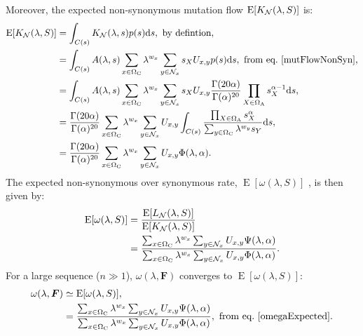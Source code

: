 Moreover, the expected non-synonymous mutation flow $\operatorname{E} [K_{\mathcal{N}}(\lambda, S)]$ is:
\begin{align}
\operatorname{E} [K_{\NonSyn}(\lambda, S)]
& =  \int_{C(s)} K_{\NonSyn}(\lambda, s) p(s) \der s, \ \textrm{by defintion}, \\
& =\int_{C(s)} A(\lambda, s) \sum_{x \in \SetCodon} \lambda^{w_x} \sum_{y \in \NxNonSyn} s_X U_{x, y} p(s) \der s , \ \textrm{from eq.}\ \ref{mutFlowNonSyn}, \\
& =\int_{C(s)} A(\lambda, s) \sum_{x \in \SetCodon} \lambda^{w_x} \sum_{y \in \NxNonSyn} s_X U_{x, y}{\frac {\Gamma (20 \alpha)}{\Gamma (\alpha )^{20}}} \prod_{X \in \SetAa} s_X^{\alpha-1} \der s,\\
& =\frac{\Gamma (20 \alpha)}{\Gamma (\alpha )^{20}} \sum_{x \in \SetCodon} \lambda^{w_x} \sum_{y \in \NxNonSyn} U_{x, y} \int_{C(s)} \dfrac{\prod_{X \in \SetAa} s_X^{\alpha}}{\sum_{y \in \SetCodon} \lambda^{w_y} s_Y}\der s,\\
& =\frac{\Gamma (20 \alpha)}{\Gamma (\alpha )^{20}} \sum_{x \in \SetCodon} \lambda^{w_x} \sum_{y \in \NxNonSyn} U_{x, y} \Phi(\lambda, \alpha).\\
\end{align}
The expected non-synonymous over synonymous rate, $\operatorname{E} [\omega(\lambda, S)]$ , is then given by:
\begin{align}
\operatorname{E} [\omega(\lambda, S)]
& =  \dfrac{\operatorname{E} [L_{\mathcal{N}}(\lambda, S)]}{\operatorname{E} [K_{\mathcal{N}}(\lambda, S)]} \\
& =\dfrac{\sum_{x \in \Omega_{\mathrm{C}}} \lambda^{w_x} \sum_{y \in \mathcal{N}_x} U_{x, y} \Psi(\lambda, \alpha)}{\sum_{x \in \Omega_{\mathrm{C}}} \lambda^{w_x} \sum_{y \in \mathcal{N}_x} U_{x, y} \Phi(\lambda, \alpha)}.
\label{omegaExpected}
\end{align}
For a large sequence ($ n \gg 1 $), $\omega (\lambda, \bm{F})$ converges to $\operatorname{E} [\omega(\lambda, S)]$:
\begin{align}
\omega (\lambda, \bm{F})
& \simeq \operatorname{E} [\omega(\lambda, S)],\\
& =\dfrac{\sum_{x \in \SetCodon} \lambda^{w_x} \sum_{y \in \NxNonSyn} U_{x, y} \Psi(\lambda, \alpha)}{\sum_{x \in \SetCodon} \lambda^{w_x} \sum_{y \in \NxNonSyn} U_{x, y} \Phi(\lambda, \alpha)}, \ \textrm{from eq.} \ \ref{omegaExpected}.
\end{align}

